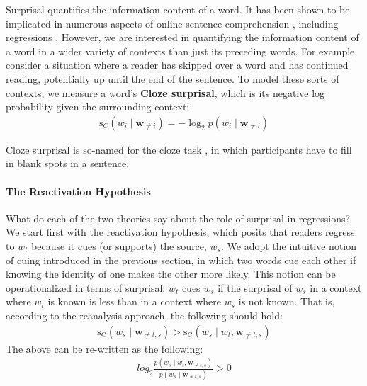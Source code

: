 \documentclass[12pt]{article}
\newcommand{\targetindex}{t}
\newcommand{\sourceindex}{s}
\newcommand{\bothindex}{\targetindex, \sourceindex}
\newcommand{\target}{$w_{\targetindex}$\xspace}
\newcommand{\targetmath}{w_{\targetindex}}
\newcommand{\source}{$w_{\sourceindex}$\xspace}
\newcommand{\sourcemath}{w_{\sourceindex}\xspace}
\newcommand{\bw}{\mathbf{w}}
\newcommand{\maskbothmath}{\bw_{\neq \bothindex}}
\begin{document}
Surprisal quantifies the information content of a word. It has been shown to be implicated in numerous aspects of online sentence comprehension \citep{hale2001probabilistic, levy2008expectation, smith2013effect, wilcox2020predictive, shain2022large}, including regressions \citep{bicknell2011readers}. However, we are interested in quantifying the information content of a word in a wider variety of contexts than just its preceding words. For example, consider a situation where a reader has skipped over a word and has continued reading, potentially up until the end of the sentence. To model these sorts of contexts, we measure a word's \textbf{Cloze surprisal}, which is its negative log probability given the surrounding context:
%
\begin{align}
    \mathrm{s}_{C}(w_i \mid \mathbf{w}_{\neq i}) = - \log_2 p(w_i \mid \mathbf{w}_{\neq i})
\end{align}

Cloze surprisal is so-named for the cloze task \cite{taylor1953cloze}, in which participants have to fill in blank spots in a sentence.

\paragraph{The Reactivation Hypothesis}

What do each of the two theories say about the role of surprisal in regressions? We start first with the reactivation hypothesis, which posits that readers regress to \target because it cues (or supports) the source, \source. We adopt the intuitive notion of cuing introduced in the previous section, in which two words cue each other if knowing the identity of one makes the other more likely. This notion can be operationalized in terms of surprisal: \target cues \source if the surprisal of \source in a context where \target is known is less than in a context where \source is not known. That is, according to the reanalysis approach, the following should hold:
%
\begin{align}
    \mathrm{s_C}(\sourcemath \mid  \maskbothmath) > \mathrm{s_C}(\sourcemath \mid \targetmath, \maskbothmath)
\end{align}
The above can be re-written as the following:
\begin{align} \label{eq:pmi-frac}
    log_2 \frac{ p(\sourcemath \mid \targetmath, \maskbothmath) }{p(\sourcemath \mid \maskbothmath) } > 0
\end{align}
\end{document}
